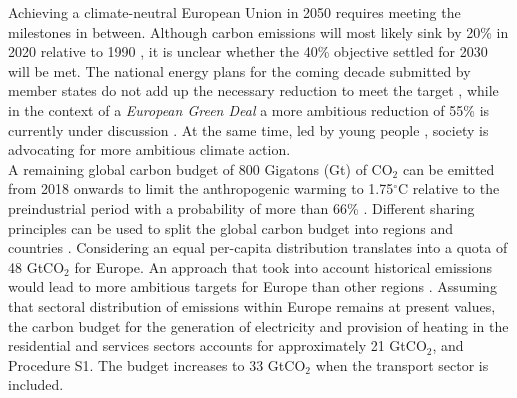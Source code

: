 \documentclass[5p]{elsarticle} %
\begin{document}
Achieving a climate-neutral European Union in 2050 \cite{in-depth_2018} requires meeting the milestones in between. Although carbon emissions will most likely sink by 20\% in 2020 relative to 1990 \cite{EEA_totalGHG}, it is unclear whether the 40\% objective settled for 2030 will be met. The national energy plans for the coming decade submitted by member states do not add up the necessary reduction to meet the target \cite{EU-appraisal_2019}, while in the context of a \textit{European Green Deal} a more ambitious reduction of 55\% is currently under discussion \cite{GreenDeal}. At the same time, led by young people \cite{Warren_2019}, society is advocating for more ambitious climate action. \\ %

A remaining global carbon budget of 800 Gigatons (Gt) of CO$_2$ can be emitted from 2018 onwards to limit the anthropogenic warming to 1.75$^{\circ}$C relative to the preindustrial period with a probability of more than 66\% \cite{IPCC_1.5}. Different sharing principles can be used to split the global carbon budget into regions and countries \cite{Raupach_2014}. Considering an equal per-capita distribution translates into a quota of 48 GtCO$_2$ for Europe. An approach that took into account historical emissions would lead to more ambitious targets for Europe than other regions \cite{Matthews_2016}. Assuming that sectoral distribution of emissions within Europe remains at present values, the carbon budget for the generation of electricity and provision of heating in the residential and services sectors accounts for approximately 21 GtCO$_2$, \cite{UNFCCC_inventory} and Procedure S1. The budget increases to 33 GtCO$_2$ when the transport sector is included. \\ 
\end{document}
